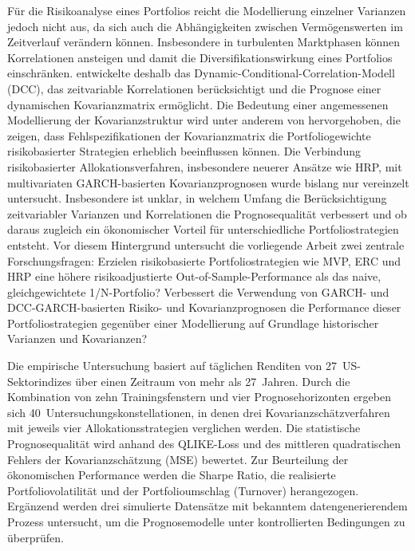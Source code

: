 \documentclass[a4paper, 12pt]{article}
\begin{document}
Für die Risikoanalyse eines Portfolios reicht die Modellierung einzelner Varianzen jedoch nicht aus, da sich auch die Abhängigkeiten zwischen Vermögenswerten im Zeitverlauf verändern können.
Insbesondere in turbulenten Marktphasen können Korrelationen ansteigen und damit die Diversifikationswirkung eines Portfolios einschränken.
\textcite{engle2002} entwickelte deshalb das Dynamic-Conditional-Correlation-Modell (DCC), das zeitvariable Korrelationen berücksichtigt und die Prognose einer dynamischen Kovarianzmatrix ermöglicht.
Die Bedeutung einer angemessenen Modellierung der Kovarianzstruktur wird unter anderem von \textcite{ardia2017} hervorgehoben, die zeigen, dass Fehlspezifikationen der Kovarianzmatrix die Portfoliogewichte risikobasierter Strategien erheblich beeinflussen können.
Die Verbindung risikobasierter Allokationsverfahren, insbesondere neuerer Ansätze wie HRP, mit multivariaten GARCH-basierten Kovarianzprognosen wurde bislang nur vereinzelt untersucht.
Insbesondere ist unklar, in welchem Umfang die Berücksichtigung zeitvariabler Varianzen und Korrelationen die Prognosequalität verbessert und ob daraus zugleich ein ökonomischer Vorteil für unterschiedliche Portfoliostrategien entsteht.
Vor diesem Hintergrund untersucht die vorliegende Arbeit zwei zentrale Forschungsfragen:
Erzielen risikobasierte Portfoliostrategien wie MVP, ERC und HRP eine höhere risikoadjustierte Out-of-Sample-Performance als das naive, gleichgewichtete 1/N-Portfolio?
Verbessert die Verwendung von GARCH- und DCC-GARCH-basierten Risiko- und Kovarianzprognosen die Performance dieser Portfoliostrategien gegenüber einer Modellierung auf Grundlage historischer Varianzen und Kovarianzen?

Die empirische Untersuchung basiert auf täglichen Renditen von 27~US-Sektorindizes über einen Zeitraum von mehr als 27~Jahren.
Durch die Kombination von zehn Trainingsfenstern und vier Prognosehorizonten ergeben sich 40~Untersuchungskonstellationen, in denen drei Kovarianzschätzverfahren mit jeweils vier Allokationsstrategien verglichen werden.
Die statistische Prognosequalität wird anhand des QLIKE-Loss und des mittleren quadratischen Fehlers der Kovarianzschätzung (MSE) bewertet.
Zur Beurteilung der ökonomischen Performance werden die Sharpe Ratio, die realisierte Portfoliovolatilität und der Portfolioumschlag (Turnover) herangezogen.
Ergänzend werden drei simulierte Datensätze mit bekanntem datengenerierendem Prozess untersucht, um die Prognosemodelle unter kontrollierten Bedingungen zu überprüfen.
\end{document}
